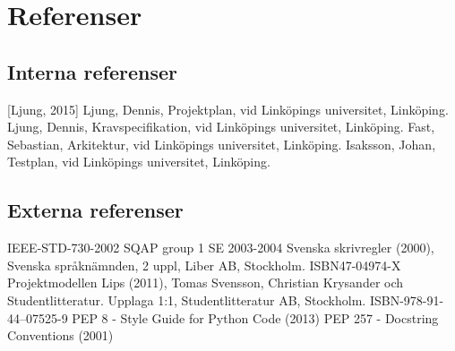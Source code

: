 \section{Referenser}


\subsection{Interna referenser}
[Ljung, 2015] Ljung, Dennis, Projektplan, vid Linköpings universitet, Linköping.
\newline
\newline
[Ljung, 2015] Ljung, Dennis, Kravspecifikation, vid Linköpings universitet, Linköping.
\newline
\newline
[Fast, 2015] Fast, Sebastian, Arkitektur, vid Linköpings universitet, Linköping.
\newline
\newline
[Isaksson, 2015] Isaksson, Johan, Testplan, vid Linköpings universitet, Linköping.

\subsection{Externa referenser}
IEEE-STD-730-2002 SQAP group 1 SE 2003-2004
\newline
\newline
Svenska skrivregler (2000), Svenska språknämnden, 2 uppl, Liber AB, Stockholm. ISBN47-04974-X
\newline
\newline
Projektmodellen Lips (2011), Tomas Svensson, Christian Krysander och Studentlitteratur. Upplaga 1:1, Studentlitteratur AB, Stockholm. ISBN-978-91-44--07525-9
\newline
\newline
PEP 8 - Style Guide for Python Code (2013)
\newline
\newline
PEP 257 - Docstring Conventions (2001)

